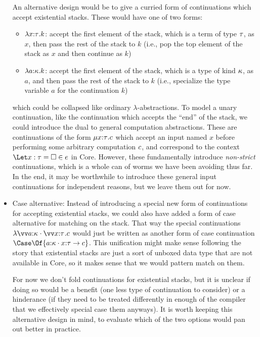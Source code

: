 \documentclass{article}
\begin{document}
\begin{itemize}
  An alternative design would be to give a curried form of continuations which
  accept existential stacks.  These would have one of two forms:
  \begin{itemize}
  \item $\lambda{x{:}{\tau}}.k$: accept the first element of the stack, which is a
    term of type $\tau$, as $x$, then pass the rest of the stack to $k$ (i.e.,
    pop the top element of the stack as $x$ and then continue as $k$)
  \item $\lambda{a{:}{\kappa}}.k$: accept the first element of the stack, which is a
    type of kind $\kappa$, as $a$, and then pass the rest of the stack to $k$
    (i.e., specialize the type variable $a$ for the continuation $k$)
  \end{itemize}
  which could be collapsed like ordinary $\lambda$-abstractions.  To model a
  unary continuation, like the continuation which accepts the ``end'' of the
  stack, we could introduce the dual to general computation abstractions.  These
  are continuations of the form $\mu{x{:}{\tau}}.c$ which accept an input
  named $x$ before performing some arbitrary computation $c$, and correspond
  to the context $\Let x:\ty = \hole \in e$ in Core.  However, these
  fundamentally introduce \emph{non-strict} continuations, which is a whole can
  of worms we have been avoiding thus far.  In the end, it may be worthwhile to
  introduce these general input continuations for independent reasons, but we
  leave them out for now.

\item Case alternative: Instead of introducing a special new form of
  continuations for accepting existential stacks, we could also have added a
  form of case alternative for matching on the stack.  That way the special
  continuations $\fnk{\packs{\vect{\ann a \ki}}{\vect{\ann x \ty}}}\com$ would
  just be written as another form of case continuation
  $\Case\Of{\packs{\ann a \ki}{\ann x \ty} \to \com}$.  This unification might
  make sense following the story that existential stacks are just a sort of
  unboxed data type that are not available in Core, so it makes sense that we
  would pattern match on them.

  For now we don't fold continuations for existential stacks, but it is unclear
  if doing so would be a benefit (one less type of continuation to consider) or
  a hinderance (if they need to be treated differently in enough of the compiler
  that we effectively special case them anyways).  It is worth keeping this
  alternative design in mind, to evaluate which of the two options would pan out
  better in practice.
\end{itemize}
\end{document}
